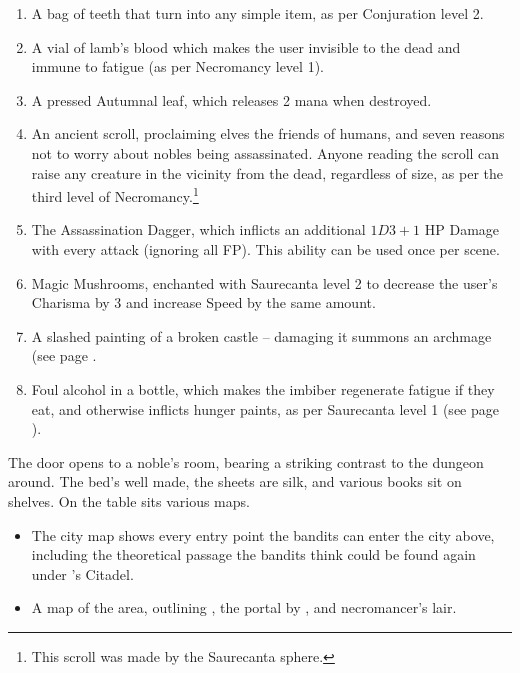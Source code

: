 \begin{multicols}{2}
\begin{enumerate}

	\item{A bag of teeth that turn into any simple item, as per Conjuration level 2.}
	\item{A vial of lamb's blood which makes the user invisible to the dead and immune to fatigue (as per Necromancy level 1).}
	\item{A pressed Autumnal leaf, which releases 2 mana when destroyed.}
	\item{An ancient scroll, proclaiming elves the friends of humans, and seven reasons not to worry about nobles being assassinated.  Anyone reading the scroll can raise any creature in the vicinity from the dead, regardless of size, as per the third level of Necromancy.\footnote{This scroll was made by the Saurecanta sphere.}}
	\item{The Assassination Dagger, which inflicts an additional $1D3+1$ HP Damage with every attack (ignoring all FP).  This ability can be used once per scene.}
	\item{Magic Mushrooms, enchanted with Saurecanta level 2 to decrease the user's Charisma by 3 and increase Speed by the same amount.}
	\item{A slashed painting of a broken castle -- damaging it summons an archmage (see page \pageref{archmage}.}
	\item{Foul alcohol in a bottle, which makes the imbiber regenerate fatigue if they eat, and otherwise inflicts hunger paints, as per Saurecanta level 1 (see page \pageref{saurecantaone}).}
\end{enumerate}


\begin{boxtext}
	The door opens to a noble's room, bearing a striking contrast to the dungeon around.  The bed's well made, the sheets are silk, and various books sit on shelves.  On the table sits various maps.
\end{boxtext}

\begin{itemize}

	\item{The city map shows every entry point the bandits can enter the city above, including the theoretical passage the bandits think could be found again under 's Citadel.}

	\item{A map of the area, outlining , the portal by , and \gls{necromancer}'s lair.}


\end{itemize}
\end{multicols}

